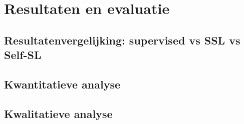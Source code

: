 \chapter{Resultaten en evaluatie}
\label{ch:resultaten-evaluatie}

\section{Resultatenvergelijking: supervised vs SSL vs Self-SL}

\lipsum

\section{Kwantitatieve analyse}

\lipsum

\section{Kwalitatieve analyse}

\lipsum